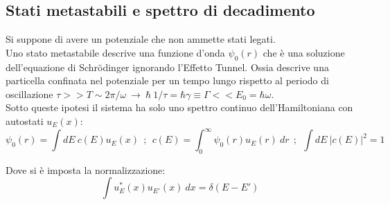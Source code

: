 \documentclass[twoside]{article}
\begin{document}
\vspace{0.5cm}

\subsection{Stati metastabili e spettro di decadimento}

Si suppone di avere un potenziale che non ammette stati legati. \\
Uno stato metastabile descrive una funzione d'onda $\psi_0 (r)$ che è una soluzione dell'equazione di Schr\"odinger ignorando l'Effetto Tunnel.
Ossia descrive una particella confinata nel potenziale per un tempo lungo rispetto al periodo di oscillazione $\tau>>T\sim 2\pi/\omega \ \rightarrow \ \hbar \ 1/\tau = \hbar \gamma \equiv \Gamma << E_0=\hbar \omega$.
\\
Sotto queste ipotesi il sistema ha solo uno spettro continuo dell'Hamiltoniana con autostati $u_E (x)$:
\begin{equation}
    \psi_0 (r)=\int dE \ c(E) u_E (x) \ \ ; \ \ c(E) =\int_0 ^{\infty} \psi_0 (r) u_E (r) \ dr \ \ ; \ \ \int dE \ |c(E)|^2 =1
\end{equation}

Dove si è imposta la normalizzazione:
\begin{equation}
    \int u_E ^* (x) u_{E'} (x) \ dx = \delta(E-E')
\end{equation}
\end{document}
